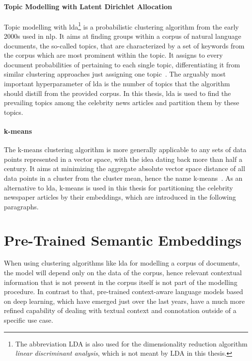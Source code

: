 \paragraph{Topic Modelling with Latent Dirichlet Allocation}\label{ch:lda}
Topic modelling with \gls{lda}\footnote{The abbreviation LDA is also used for the dimensionality reduction algorithm \textit{linear discriminant analysis}, which is not meant by LDA in this thesis.} is a probabilistic clustering algorithm from the early 2000s used in \gls{nlp}. It aims at finding groups within a corpus of natural language documents, the so-called topics, that are characterized by a set of keywords from the corpus which are most prominent within the topic. It assigns to every document probabilities of pertaining to each single topic, differentiating it from similar clustering approaches just assigning one topic~\autocite{blei_latent_2003, blei_probabilistic_2012}. The arguably most important hyperparameter of \gls{lda} is the number of topics that the algorithm should distill from the provided corpus. In this thesis, \gls{lda} is used to find the prevailing topics among the celebrity news articles and partition them by these topics.

\paragraph{k-means}
The k-means clustering algorithm is more generally applicable to any sets of data points represented in a vector space, with the idea dating back more than half a century. It aims at minimizing the aggregate absolute vector space distance of all data points in a cluster from the cluster mean, hence the name k-means~\autocite{macqueen_methods_1967}. As an alternative to \gls{lda}, k-means is used in this thesis for partitioning the celebrity newspaper articles by their embeddings, which are introduced in the following paragraphs.



\section{Pre-Trained Semantic Embeddings}\label{ch:pretrained_algorithms}
When using clustering algorithms like \gls{lda} for modelling a corpus of documents, the model will depend only on the data of the corpus, hence relevant contextual information that is not present in the corpus itself is not part of the modelling procedure. 
In contrast to that, pre-trained context-aware language models based on deep learning, which have emerged just over the last years, have a much more refined capability of dealing with textual context and connotation outside of a specific use case.

